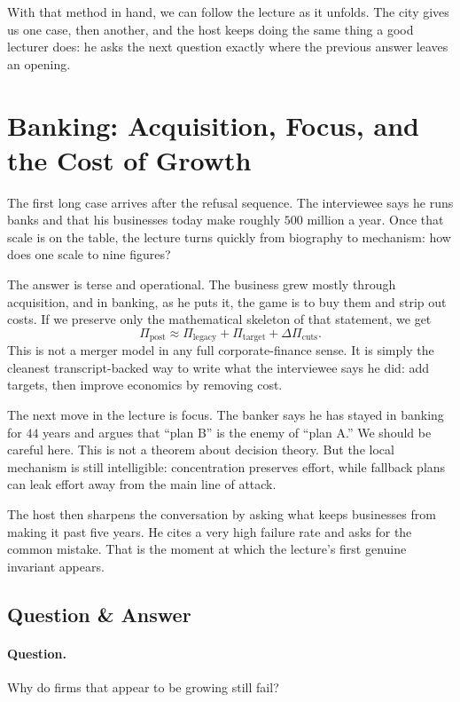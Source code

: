 With that method in hand, we can follow the lecture as it unfolds. The city gives us one case, then another, and the host keeps doing the same thing a good lecturer does: he asks the next question exactly where the previous answer leaves an opening.

\section{Banking: Acquisition, Focus, and the Cost of Growth}

The first long case arrives after the refusal sequence. The interviewee says he runs banks and that his businesses today make roughly \(500\) million a year. Once that scale is on the table, the lecture turns quickly from biography to mechanism: how does one scale to nine figures?

The answer is terse and operational. The business grew mostly through acquisition, and in banking, as he puts it, the game is to buy them and strip out costs. If we preserve only the mathematical skeleton of that statement, we get
\begin{equation}
\Pi_{\mathrm{post}} \approx \Pi_{\mathrm{legacy}} + \Pi_{\mathrm{target}} + \Delta \Pi_{\mathrm{cuts}}.
\end{equation}
This is not a merger model in any full corporate-finance sense. It is simply the cleanest transcript-backed way to write what the interviewee says he did: add targets, then improve economics by removing cost.

The next move in the lecture is focus. The banker says he has stayed in banking for \(44\) years and argues that ``plan B'' is the enemy of ``plan A.'' We should be careful here. This is not a theorem about decision theory. But the local mechanism is still intelligible: concentration preserves effort, while fallback plans can leak effort away from the main line of attack.

The host then sharpens the conversation by asking what keeps businesses from making it past five years. He cites a very high failure rate and asks for the common mistake. That is the moment at which the lecture's first genuine invariant appears.

\subsection{Question \& Answer}

\paragraph{Question.} Why do firms that appear to be growing still fail?

